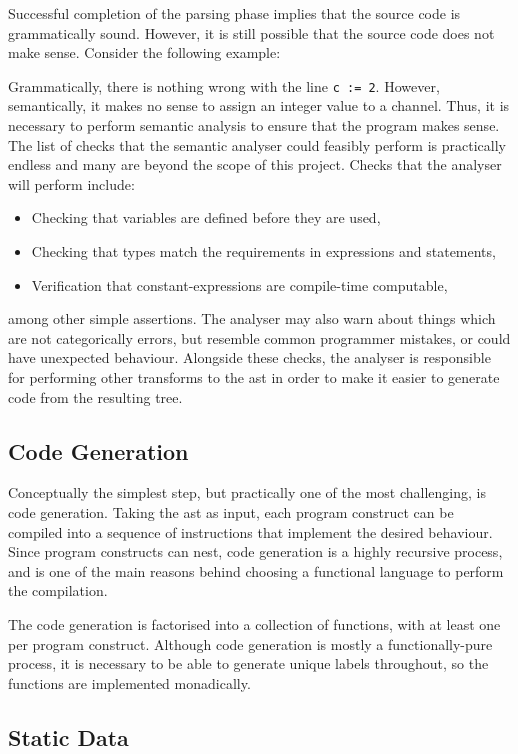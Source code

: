 Successful completion of the parsing phase implies that the source code is
grammatically sound. However, it is still possible that the source code does not
make sense. Consider the following example:

Grammatically, there is nothing wrong with the line \texttt{c := 2}. However,
semantically, it makes no sense to assign an integer value to a channel. Thus,
it is necessary to perform semantic analysis to ensure that the program makes
sense. The list of checks that the semantic analyser could feasibly perform is
practically endless and many are beyond the scope of this project. Checks that
the analyser will perform include:
\begin{itemize}
  \item Checking that variables are defined before they are used,
  \item Checking that types match the requirements in expressions and
        statements,
  \item Verification that constant-expressions are compile-time
        computable,
\end{itemize}
among other simple assertions. The analyser may also warn about things which are
not categorically errors, but resemble common programmer mistakes, or could have
unexpected behaviour. Alongside these checks, the analyser is responsible for
performing other transforms to the \gls{ast} in order to make it easier to
generate code from the resulting tree.

\subsection{Code Generation} \label{code-gen}

Conceptually the simplest step, but practically one of the most challenging,
is code generation. Taking the \gls{ast} as input, each program construct can be
compiled into a sequence of instructions that implement the desired behaviour.
Since program constructs can nest, code generation is a highly recursive
process, and is one of the main reasons behind choosing a functional language to
perform the compilation.

The code generation is factorised into a collection of functions, with at least
one per program construct. Although code generation is mostly a
functionally-pure process, it is necessary to be able to generate unique labels
throughout, so the functions are implemented monadically.

\subsection{Static Data} \label{static-blob}

